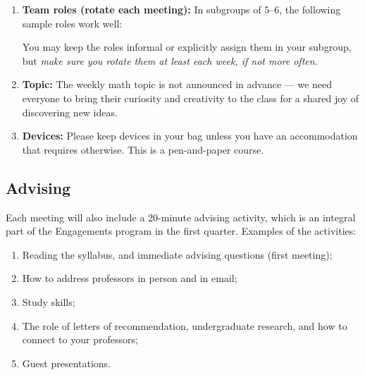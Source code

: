 \documentclass[oneside,11pt]{amsart}
\begin{document}
\begin{enumerate}[$\bullet$]
  \item \textbf{Team roles (rotate each meeting):} In subgroups of $5$--$6$,
		the following sample roles work well:
		You may keep the roles informal or explicitly assign them in your
		subgroup, but \emph{make sure you rotate them at least each week,
		if not more often}.

	\item \textbf{Topic:}
		The weekly math topic is not announced in advance --- we
		need everyone to bring their curiosity and creativity to
		the class for a shared joy of discovering new ideas.

  \item \textbf{Devices:} Please keep devices in your bag
		unless you have an accommodation that requires otherwise.
		This is a pen-and-paper course.
\end{enumerate}



\subsection{Advising}
Each meeting will also include a 20-minute advising activity, which is an integral part of the Engagements program in the first quarter.
Examples of the activities:
\begin{enumerate}[$\bullet$]
\item Reading the syllabus, and immediate advising questions (first meeting);
\item How to address professors in person and in email;
\item Study skills;
\item The role of letters of recommendation, undergraduate research, and how to connect to your professors;
\item Guest presentations.
\end{enumerate}
\end{document}
